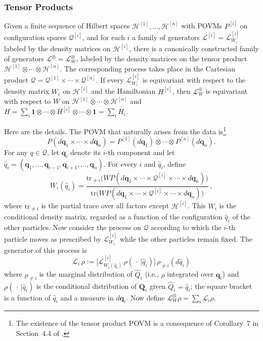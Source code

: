 \documentclass[12pt]{article}
\newcommand{\1}{\mathbf{1}} %
\newcommand{\tr}{\mathrm{tr}} %
\newcommand{\Hilbert}{\mathscr{H}}
\newcommand{\conf}{\mathcal{Q}} %
\newcommand{\generator}{\mathscr{L}} %
\newcommand{\pov}{{P}}%
\newcommand{\vq}{{\boldsymbol q}}
\newcommand{\vQ}{{\boldsymbol Q}}
\begin{document}
\subsubsection{Tensor Products}\label{sec:tensorproduct}

   Given a finite sequence of Hilbert spaces
   $\Hilbert^{[1]}, \ldots, \Hilbert^{[n]}$ with POVMs $\pov^{[i]}$ on
   configuration spaces $\conf^{[i]}$, and for each $i$ a family of
   generators $\generator^{[i]} = \generator^{[i]}_{W_i}$  labeled
   by the density matrices on $\Hilbert^{[i]}$, there is a canonically
   constructed family of generators $\generator^\otimes =
   \generator^\otimes_W$, labeled by the density matrices on the tensor
   product $\Hilbert^{[1]} \otimes \cdots \otimes \Hilbert^{[n]}$. The
   corresponding process takes place in the Cartesian product $\conf =
   \conf^{[1]} \times \cdots \times \conf^{[n]}$. If every
   $\generator^{[i]}_{W_i}$ is equivariant with respect to the density
   matrix $W_i$ on $\Hilbert^{[i]}$ and the Hamiltonian $H^{[i]}$, then
   $\generator^\oplus_W$ is equivariant with respect to $W$ on
   $\Hilbert^{[1]} \otimes \cdots \otimes \Hilbert^{[n]}$ and $H =
   \sum\limits_i \1 \otimes \cdots \otimes H^{[i]} \otimes \cdots
   \otimes \1 = \sum\limits_i H_i$.

\newcommand{\hqi}{\widehat{q}_i}

   Here are the details. The POVM that naturally arises from the data
   is\footnote{The existence of the tensor product POVM is a
   consequence of Corollary~7 in Section~4.4 of \cite{crea2A}.}
   \begin{equation}\label{productpovm}
     \pov(d\vq_1 \times \cdots \times d\vq_n) = \pov^{[1]}(d\vq_1)
     \otimes \cdots \otimes \pov^{[n]}(d\vq_n).
   \end{equation}
   For any $q \in \conf$, let $\vq_i$ denote its $i$-th component and
   let $\hqi = (\vq_1, \ldots, \vq_{i-1}, \vq_{i+1}, \ldots,
   \vq_n)$. For every $i$ and $\hqi$, define
   \[
     W_i (\hqi) = \frac{\tr_{\neq i} \big( W \pov(d\vq_1 \times \cdots
     \times \conf^{[i]} \times \cdots \times d\vq_n) \big)} {\tr \big(W
     \pov(d\vq_1 \times \cdots \times \conf^{[i]} \times \cdots \times
     d\vq_n) \big)}\,,
   \]
   where $\tr_{\neq i}$ is the partial trace over all factors except
   $\Hilbert^{[i]}$. This $W_i$ is the conditional density matrix,
   regarded as a function of the configuration $\hqi$ of the other
   particles.  Now consider the process on $\conf$ according to which
   the $i$-th particle moves as prescribed by $\generator^{[i]}_{W_i}$
   while the other particles remain fixed.  The generator of this
   process is
   \begin{equation}\label{Lidef}
     \generator_i \, \rho := \Big[ \generator^{[i]}_{W_i(\hqi)} \,
     \rho( \,\cdot\,| \hqi) \Big] \, \rho_{\neq i}(d\hqi)
   \end{equation}
   where $\rho_{\neq i}$ is the marginal distribution of
   $\widehat{Q}_i$ (i.e., $\rho$ integrated over $\vq_i$) and
   $\rho(\,\cdot\,|\hqi)$ is the conditional distribution of $\vQ_i$
   given $\widehat{Q}_i = \hqi$; the square bracket is a function of
   $\hqi$ and a measure in $d\vq_i$.  Now define $\generator^\otimes_W
   \rho = \sum\limits_i \generator_i \rho$.
\end{document}
